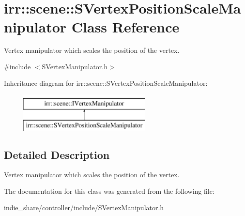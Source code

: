\hypertarget{classirr_1_1scene_1_1SVertexPositionScaleManipulator}{}\section{irr\+:\+:scene\+:\+:S\+Vertex\+Position\+Scale\+Manipulator Class Reference}
\label{classirr_1_1scene_1_1SVertexPositionScaleManipulator}


Vertex manipulator which scales the position of the vertex.  




{\ttfamily \#include $<$S\+Vertex\+Manipulator.\+h$>$}

Inheritance diagram for irr\+:\+:scene\+:\+:S\+Vertex\+Position\+Scale\+Manipulator\+:\begin{figure}[H]
\begin{center}
\leavevmode
\includegraphics[height=2.000000cm]{classirr_1_1scene_1_1SVertexPositionScaleManipulator}
\end{center}
\end{figure}


\subsection{Detailed Description}
Vertex manipulator which scales the position of the vertex. 

The documentation for this class was generated from the following file\+:\begin{DoxyCompactItemize}
\item 
indie\+\_\+share/controller/include/S\+Vertex\+Manipulator.\+h\end{DoxyCompactItemize}
